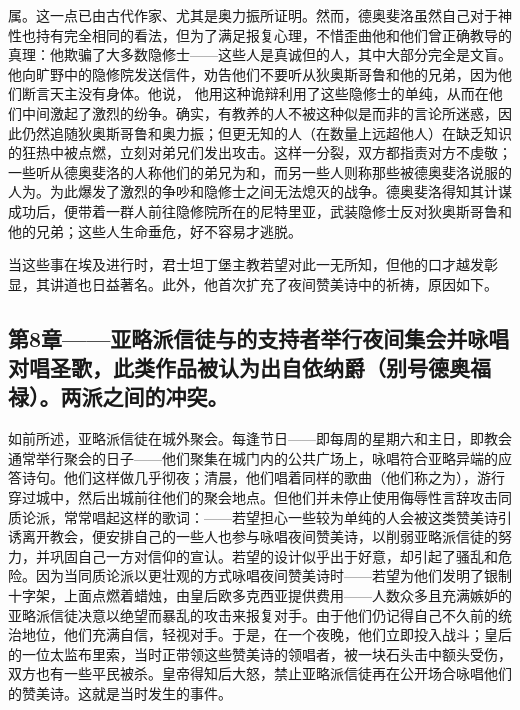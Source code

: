 属。这一点已由古代作家、尤其是奥力振所证明。然而，德奥斐洛虽然自己对于神性也持有完全相同的看法，但为了满足报复心理，不惜歪曲他和他们曾正确教导的真理：他欺骗了大多数隐修士——这些人是真诚但的人，其中大部分完全是文盲。他向旷野中的隐修院发送信件，劝告他们不要听从狄奥斯哥鲁和他的兄弟，因为他们断言天主没有身体。他说， 他用这种诡辩利用了这些隐修士的单纯，从而在他们中间激起了激烈的纷争。\newline{}确实，有教养的人不被这种似是而非的言论所迷惑，因此仍然追随狄奥斯哥鲁和奥力振；但更无知的人（在数量上远超他人）在缺乏知识的狂热中被点燃，立刻对弟兄们发出攻击。这样一分裂，双方都指责对方不虔敬；一些听从德奥斐洛的人称他们的弟兄为和，而另一些人则称那些被德奥斐洛说服的人为。为此爆发了激烈的争吵和隐修士之间无法熄灭的战争。德奥斐洛得知其计谋成功后，便带着一群人前往隐修院所在的尼特里亚，武装隐修士反对狄奥斯哥鲁和他的兄弟；这些人生命垂危，好不容易才逃脱。\par

当这些事在埃及进行时，君士坦丁堡主教若望对此一无所知，但他的口才越发彰显，其讲道也日益著名。此外，他首次扩充了夜间赞美诗中的祈祷，原因如下。\par


\subsection{第8章——亚略派信徒与的支持者举行夜间集会并咏唱对唱圣歌，此类作品被认为出自依纳爵（别号德奥福禄）。两派之间的冲突。}

如前所述，亚略派信徒在城外聚会。每逢节日——即每周的星期六和主日，即教会通常举行聚会的日子——他们聚集在城门内的公共广场上，咏唱符合亚略异端的应答诗句。他们这样做几乎彻夜；清晨，他们唱着同样的歌曲（他们称之为），游行穿过城中，然后出城前往他们的聚会地点。但他们并未停止使用侮辱性言辞攻击同质论派，常常唱起这样的歌词：——若望担心一些较为单纯的人会被这类赞美诗引诱离开教会，便安排自己的一些人也参与咏唱夜间赞美诗，以削弱亚略派信徒的努力，并巩固自己一方对信仰的宣认。若望的设计似乎出于好意，却引起了骚乱和危险。因为当同质论派以更壮观的方式咏唱夜间赞美诗时——若望为他们发明了银制十字架，上面点燃着蜡烛，由皇后欧多克西亚提供费用——人数众多且充满嫉妒的亚略派信徒决意以绝望而暴乱的攻击来报复对手。由于他们仍记得自己不久前的统治地位，他们充满自信，轻视对手。于是，在一个夜晚，他们立即投入战斗；皇后的一位太监布里索，当时正带领这些赞美诗的领唱者，被一块石头击中额头受伤，双方也有一些平民被杀。皇帝得知后大怒，禁止亚略派信徒再在公开场合咏唱他们的赞美诗。这就是当时发生的事件。\par


